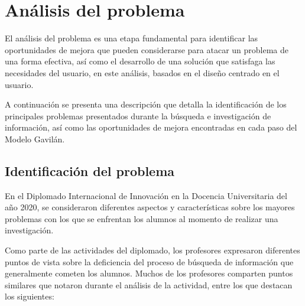 
\section{Análisis del problema}
\label{AnalisisProblemacapIV}

El análisis del problema es una etapa fundamental para identificar las oportunidades de mejora que pueden considerarse para atacar un problema de una forma efectiva, así como el desarrollo de una solución que satisfaga las necesidades del usuario, en este análisis, basados en el diseño centrado en el usuario.

A continuación se presenta una descripción que detalla la identificación de los principales problemas presentados durante la búsqueda e investigación de información, así como las oportunidades de mejora encontradas en cada paso del Modelo Gavilán.


\subsection{Identificación del problema}
\label{IdentificacionProblemacapIV}

En el Diplomado Internacional de Innovación en la Docencia Universitaria del año 2020, se consideraron diferentes aspectos y características sobre los mayores problemas con los que se enfrentan los alumnos al momento de realizar una investigación.

Como parte de las actividades del diplomado, los profesores expresaron diferentes puntos de vista sobre la deficiencia del proceso de búsqueda de información que generalmente cometen los alumnos. Muchos de los profesores comparten puntos similares que notaron durante el análisis de la actividad, entre los que destacan los siguientes:

